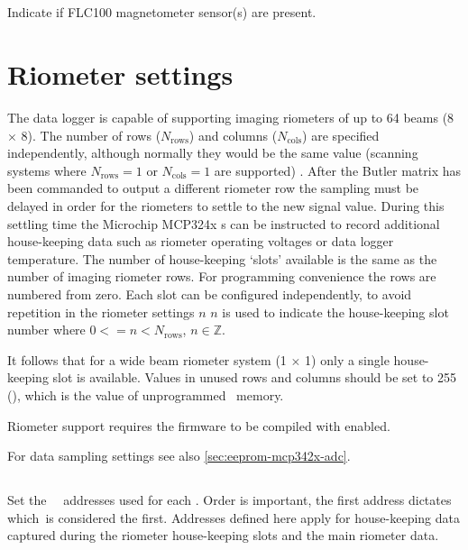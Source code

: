 \subsection[flc100-present]{}
Indicate if FLC100 magnetometer sensor(s) are present.

\section{Riometer settings}
The data logger is capable of supporting imaging riometers of up to 64
beams (8 \ensuremath{\times} 8). The number of rows
($N_\mathrm{rows}$) and columns ($N_\mathrm{cols}$) are specified
independently, although normally they would be the same value
(scanning systems where $N_\mathrm{rows} = 1$ or $N_\mathrm{cols} = 1$
are supported) . After the Butler matrix has been commanded to output
a different riometer row the sampling must be delayed in order for the
riometers to settle to the new signal value. During this settling time
the Microchip MCP324x \adc s can be instructed to record additional
house-keeping data such as riometer operating voltages or data logger
temperature. The number of house-keeping `slots' available is the same
as the number of imaging riometer rows. For programming convenience
the rows are numbered from zero. Each slot can be configured
independently, to avoid repetition in the riometer settings $n$ $n$ is
used to indicate the house-keeping slot number where
$0 <= n < N_\mathrm{rows}$, $n \in \mathbb{Z}$.

It follows that for a wide beam riometer system (1 \ensuremath{\times}
1) only a single house-keeping slot is available. Values in unused rows and
columns should be set to 255 (), which is the value of
unprogrammed \eeprom\ memory.

Riometer support requires the firmware to be compiled with
 enabled.

For data sampling settings see also \ref{sec:eeprom-mcp342x-adc}.

\subsection[generic-adc-address-list]{}
Set the \adc\ \itwoc\ addresses used for each \adc. Order is
important, the first address dictates which\adc\ is considered the
first. Addresses defined here apply for house-keeping data captured
during the riometer house-keeping slots and the main riometer data.

